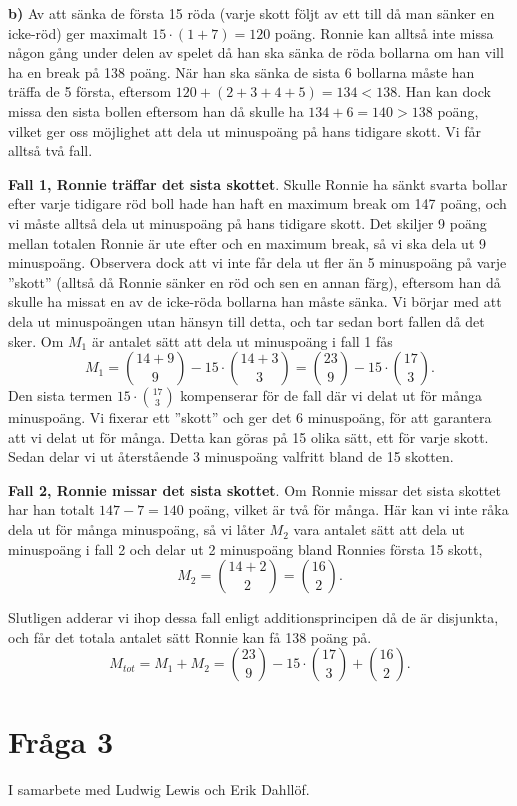 \documentclass{article}
\begin{document}
\textbf{b)}
Av att sänka de första 15 röda (varje skott följt av ett till då man sänker en icke-röd) ger maximalt $15\cdot\left( 1 + 7 \right) = 120$ poäng. Ronnie kan alltså inte missa någon gång under delen av spelet då han ska sänka de röda bollarna om han vill ha en break på 138 poäng. När han ska sänka de sista 6 bollarna måste han träffa de 5 första, eftersom $120 + \left( 2 + 3 + 4 + 5 \right) = 134 < 138 $. Han kan dock missa den sista bollen eftersom han då skulle ha $134 + 6 = 140 > 138$ poäng, vilket ger oss möjlighet att dela ut minuspoäng på hans tidigare skott. Vi får alltså två fall.

\textbf{Fall 1, Ronnie träffar det sista skottet}.
Skulle Ronnie ha sänkt svarta bollar efter varje tidigare röd boll hade han haft en maximum break om 147 poäng, och vi måste alltså dela ut minuspoäng på hans tidigare skott. Det skiljer 9 poäng mellan totalen Ronnie är ute efter och en maximum break, så vi ska dela ut 9 minuspoäng. Observera dock att vi inte får dela ut fler än 5 minuspoäng på varje ''skott'' (alltså då Ronnie sänker en röd och sen en annan färg), eftersom han då skulle ha missat en av de icke-röda bollarna han måste sänka. Vi börjar med att dela ut minuspoängen utan hänsyn till detta, och tar sedan bort fallen då det sker. Om $M_1$ är antalet sätt att dela ut minuspoäng i fall 1 fås
\[
	M_1 = {14 + 9 \choose 9} - 15 \cdot {14 + 3 \choose 3} = {23 \choose 9} - 15 \cdot {17 \choose 3}
.\] 
Den sista termen $15 \cdot {17 \choose 3}$ kompenserar för de fall där vi delat ut för många minuspoäng. Vi fixerar ett ''skott'' och ger det 6 minuspoäng, för att garantera att vi delat ut för många. Detta kan göras på 15 olika sätt, ett för varje skott. Sedan delar vi ut återstående 3 minuspoäng valfritt bland de 15 skotten.

\textbf{Fall 2, Ronnie missar det sista skottet}.
Om Ronnie missar det sista skottet har han totalt $147 - 7 = 140$ poäng, vilket är två för många. Här kan vi inte råka dela ut för många minuspoäng, så vi låter $M_2$ vara antalet sätt att dela ut minuspoäng i fall 2 och delar ut 2 minuspoäng bland Ronnies första 15 skott,
\[
	M_2 = {14 + 2 \choose 2} = {16 \choose 2}
.\] 

Slutligen adderar vi ihop dessa fall enligt additionsprincipen då de är disjunkta, och får det totala antalet sätt Ronnie kan få 138 poäng på.
\[
	M_{tot} = M_1+M_2 = {23 \choose 9} - 15 \cdot {17 \choose 3} + {16 \choose 2}
.\] 

\section{Fråga 3}
I samarbete med Ludwig Lewis och Erik Dahllöf.
\end{document}

